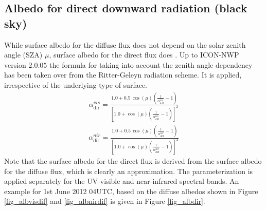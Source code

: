 \documentclass[a4paper,11pt]{article}
\begin{document}
\subsection{Albedo for direct downward radiation (black sky)}
While surface albedo for the diffuse flux does not depend on the solar zenith angle (SZA) $\mu$, surface albedo for the direct flux does \citep{Yang:2008}. 
Up to ICON-NWP version $2.0.05$ the formula for taking into account the zenith angle dependency has been taken over from the Ritter-Geleyn radiation scheme. 
It is applied, irrespective of the underlying type of surface.
\begin{align}
  \alpha_{\mathrm{dir}}^{vis} = \frac{1.0 + 0.5\, \cos(\mu)  \left(\frac{1}{\alpha_{\mathrm{diff}}^{vis}}-1\right)}
                              {\left[1.0 + \cos(\mu)  \left(\frac{1}{\alpha_{\mathrm{diff}}^{vis}}-1\right)\right]^{2}} \label{eq_albvisdir}
\end{align}
\begin{align}
  \alpha_{\mathrm{dir}}^{nir} = \frac{1.0 + 0.5\, \cos(\mu)  \left(\frac{1}{\alpha_{\mathrm{diff}}^{nir}}-1\right)}
                              {\left[1.0 + \cos(\mu)  \left(\frac{1}{\alpha_{\mathrm{diff}}^{nir}}-1\right)\right]^{2}} \label{eq_albnirdir}
\end{align}
Note that the surface albedo for the direct flux is derived from the surface albedo for the diffuse flux, which is clearly an approximation. 
The parameterization is applied separately for the UV-visible and near-infrared spectral bands. An example for 1st June 2012 04UTC, 
based on the diffuse albedos shown in Figure \ref{fig_albvisdif} and \ref{fig_albnirdif} is given in Figure \ref{fig_albdir}. 
\end{document}
